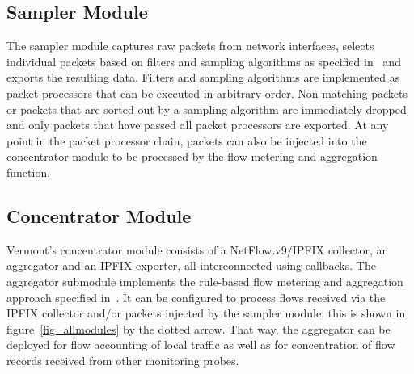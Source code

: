 \subsection{Sampler Module}
\label{sec_sampler}

The sampler module captures raw packets from network interfaces, selects individual packets based on filters and sampling algorithms as specified in~\cite{ietf-psamp-sample-tech} and exports the resulting data.
Filters and sampling algorithms are implemented as packet processors that can be executed in arbitrary order.
Non-matching packets or packets that are sorted out by a sampling algorithm are immediately dropped and only packets that have passed all packet processors are exported.
At any point in the packet processor chain, packets can also be injected into the concentrator module to be processed by the flow metering and aggregation function.

\subsection{Concentrator Module}
\label{sec_concentrator}

Vermont's concentrator module consists of a NetFlow.v9/IPFIX collector, an aggregator and an IPFIX exporter, all interconnected using callbacks.
The aggregator submodule implements the rule-based flow metering and aggregation approach specified in~\cite{dressler-ipfix-aggregation}.
It can be configured to process flows received via the IPFIX collector and/or packets injected by the sampler module; this is shown in figure~\ref{fig_allmodules} by the dotted arrow.
That way, the aggregator can be deployed for flow accounting of local traffic as well as for concentration of flow records received from other monitoring probes. 


%


